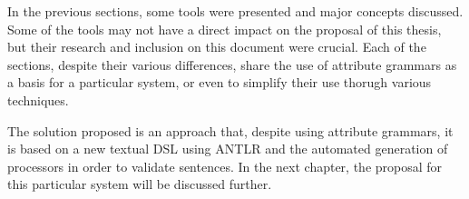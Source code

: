 In the previous sections, some tools were presented and major concepts discussed.
Some of the tools may not have a direct impact on the proposal of this thesis, but their research and inclusion on this document were crucial.
Each of the sections, despite their various differences, share the use of attribute grammars as a basis for a particular system,
or even to simplify their use thorugh various techniques.

The solution proposed is an approach that, despite using attribute grammars, 
it is based on a new textual \textsc{DSL} using \textsc{ANTLR} and the automated generation of processors in order to validate sentences.
In the next chapter, the proposal for this particular system will be discussed further.


